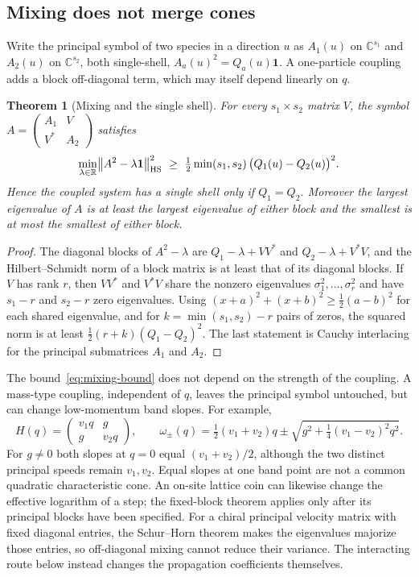 \documentclass[12pt]{article}
\newtheorem{theorem}{Theorem}
\theoremstyle{definition}
\theoremstyle{remark}
\begin{document}
\subsection{Mixing does not merge cones}

Write the principal symbol of two species in a direction $u$ as $A_1(u)$ on $\mathbb C^{s_1}$ and $A_2(u)$ on $\mathbb C^{s_2}$, both single-shell, $A_a(u)^2=Q_a(u)\mathbf 1$. A one-particle coupling adds a block off-diagonal term, which may itself depend linearly on $q$.

\begin{theorem}[Mixing and the single shell]
\label{thm:mixing}
For every $s_1\times s_2$ matrix $V$, the symbol $A=\begin{pmatrix}A_1&V\\ V^*&A_2\end{pmatrix}$ satisfies
\begin{equation}
\min_{\lambda\in\mathbb R}\bigl\|A^2-\lambda\mathbf 1\bigr\|_{\rm HS}^2\ \ge\ \tfrac12\min(s_1,s_2)\,\bigl(Q_1(u)-Q_2(u)\bigr)^2 .
\label{eq:mixing-bound}
\end{equation}
Hence the coupled system has a single shell only if $Q_1=Q_2$. Moreover the largest eigenvalue of $A$ is at least the largest eigenvalue of either block and the smallest is at most the smallest of either block.
\end{theorem}

\begin{proof}
The diagonal blocks of $A^2-\lambda$ are $Q_1-\lambda+VV^*$ and $Q_2-\lambda+V^*V$, and the Hilbert--Schmidt norm of a block matrix is at least that of its diagonal blocks. If $V$ has rank $r$, then $VV^*$ and $V^*V$ share the nonzero eigenvalues $\sigma_1^2,\dots,\sigma_r^2$ and have $s_1-r$ and $s_2-r$ zero eigenvalues. Using $(x+a)^2+(x+b)^2\ge\frac12(a-b)^2$ for each shared eigenvalue, and for $k=\min(s_1,s_2)-r$ pairs of zeros, the squared norm is at least $\frac12(r+k)(Q_1-Q_2)^2$. The last statement is Cauchy interlacing for the principal submatrices $A_1$ and $A_2$.
\end{proof}

The bound~\eqref{eq:mixing-bound} does not depend on the strength of the coupling. A mass-type coupling, independent of $q$, leaves the principal symbol untouched, but can change low-momentum band slopes. For example,
\[
 H(q)=\begin{pmatrix}v_1q&g\\g&v_2q\end{pmatrix},\qquad
 \omega_\pm(q)=\tfrac12(v_1+v_2)q
 \pm\sqrt{g^2+\tfrac14(v_1-v_2)^2q^2}.
\]
For $g\ne0$ both slopes at $q=0$ equal $(v_1+v_2)/2$, although the two distinct principal speeds remain $v_1,v_2$. Equal slopes at one band point are not a common quadratic characteristic cone. An on-site lattice coin can likewise change the effective logarithm of a step; the fixed-block theorem applies only after its principal blocks have been specified. For a chiral principal velocity matrix with fixed diagonal entries, the Schur--Horn theorem makes the eigenvalues majorize those entries, so off-diagonal mixing cannot reduce their variance. The interacting route below instead changes the propagation coefficients themselves.
\end{document}
